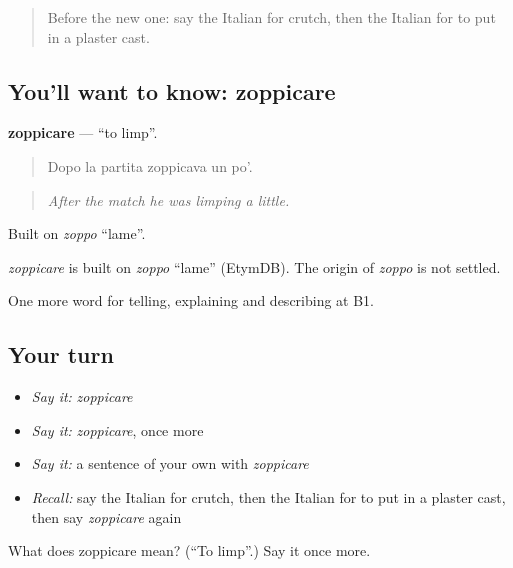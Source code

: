 \label{lesson:IT-C484-zoppicare}



\begin{quote}
Before the new one: say the Italian for crutch, then the Italian for to put in a plaster cast.
\end{quote}

\subsection*{You'll want to know: zoppicare}
\textbf{zoppicare} — \textquotedblleft{}to limp\textquotedblright{}.

\begin{quote}
Dopo la partita zoppicava un po'.
\end{quote}

\begin{quote}
\emph{After the match he was limping a little.}
\end{quote}

Built on \emph{zoppo} \textquotedblleft{}lame\textquotedblright{}.

\begin{cousinweb}
\emph{zoppicare} is built on \emph{zoppo} \textquotedblleft{}lame\textquotedblright{} (EtymDB). The origin of \emph{zoppo} is not settled.
\end{cousinweb}

\begin{grammarlens}[title={What you've built}]
One more word for telling, explaining and describing at B1.
\end{grammarlens}

\subsection*{Your turn}
\begin{itemize}
\raggedright
  \item \emph{Say it:} \emph{zoppicare}
  \item \emph{Say it:} \emph{zoppicare}, once more
  \item \emph{Say it:} a sentence of your own with \emph{zoppicare}
  \item \emph{Recall:} say the Italian for crutch, then the Italian for to put in a plaster cast, then say \emph{zoppicare} again
\end{itemize}

\begin{tcolorbox}[breakable,colback=teal!4,colframe=teal!35!black,title={Before you move on}]
What does zoppicare mean? (\textquotedblleft{}To limp\textquotedblright{}.) Say it once more.
\end{tcolorbox}
